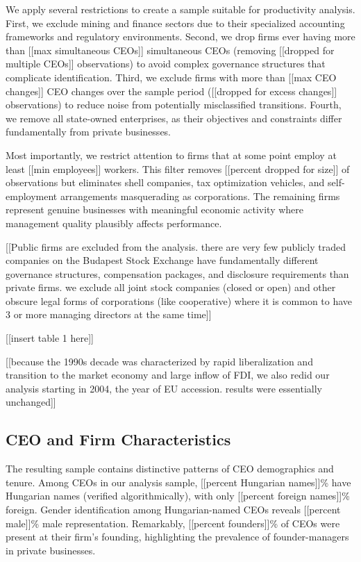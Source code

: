 \documentclass[11pt,a4paper]{article}
\begin{document}
We apply several restrictions to create a sample suitable for productivity analysis. First, we exclude mining and finance sectors due to their specialized accounting frameworks and regulatory environments. Second, we drop firms ever having more than [[max simultaneous CEOs]] simultaneous CEOs (removing [[dropped for multiple CEOs]] observations) to avoid complex governance structures that complicate identification. Third, we exclude firms with more than [[max CEO changes]] CEO changes over the sample period ([[dropped for excess changes]] observations) to reduce noise from potentially misclassified transitions. Fourth, we remove all state-owned enterprises, as their objectives and constraints differ fundamentally from private businesses.

Most importantly, we restrict attention to firms that at some point employ at least [[min employees]] workers. This filter removes [[percent dropped for size]] of observations but eliminates shell companies, tax optimization vehicles, and self-employment arrangements masquerading as corporations. The remaining firms represent genuine businesses with meaningful economic activity where management quality plausibly affects performance.

[[Public firms are excluded from the analysis. there are very few publicly traded companies on the Budapest Stock Exchange have fundamentally different governance structures, compensation packages, and disclosure requirements than private firms. we exclude all joint stock companies (closed or open) and other obscure legal forms of corporations (like cooperative) where it is common to have 3 or more managing directors at the same time]]

[[insert table 1 here]]

[[because the 1990s decade was characterized by rapid liberalization and transition to the market economy and large inflow of FDI, we also redid our analysis starting in 2004, the year of EU accession. results were essentially unchanged]]

\subsection{CEO and Firm Characteristics}

The resulting sample contains distinctive patterns of CEO demographics and tenure. Among CEOs in our analysis sample, [[percent Hungarian names]]\% have Hungarian names (verified algorithmically), with only [[percent foreign names]]\% foreign. Gender identification among Hungarian-named CEOs reveals [[percent male]]\% male representation. Remarkably, [[percent founders]]\% of CEOs were present at their firm's founding, highlighting the prevalence of founder-managers in private businesses.
\end{document}

